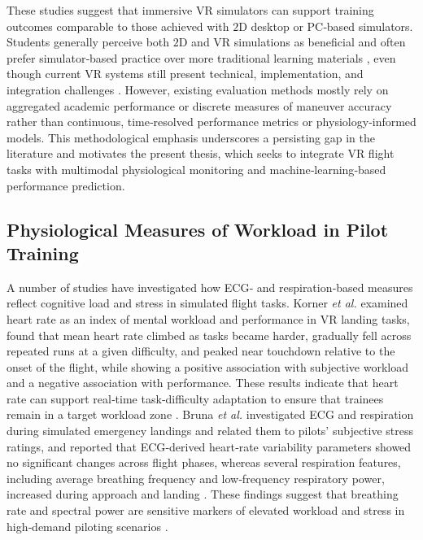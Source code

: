 \documentclass[11pt, a4paper]{article}
\begin{document}
These studies suggest that immersive VR simulators can support training outcomes comparable to those achieved with $2$D desktop or PC‑based simulators. Students generally perceive both $2$D and VR simulations as beneficial and often prefer simulator‑based practice over more traditional learning materials \cite{hight-2022,guthridge-2023}, even though current VR systems still present technical, implementation, and integration challenges \cite{pena-2025}. However, existing evaluation methods mostly rely on aggregated academic performance or discrete measures of maneuver accuracy rather than continuous, time‑resolved performance metrics or physiology‑informed models. This methodological emphasis underscores a persisting gap in the literature and motivates the present thesis, which seeks to integrate VR flight tasks with multimodal physiological monitoring and machine‑learning‑based performance prediction.

\subsection{Physiological Measures of Workload in Pilot Training}
A number of studies have investigated how ECG‑ and respiration‑based measures reflect cognitive load and stress in simulated flight tasks. Korner \emph{et al.} \cite{koerner-2025} examined heart rate as an index of mental workload and performance in VR landing tasks, found that mean heart rate climbed as tasks became harder, gradually fell across repeated runs at a given difficulty, and peaked near touchdown relative to the onset of the flight, while showing a positive association with subjective workload and a negative association with performance. These results indicate that heart rate can support real‑time task‑difficulty adaptation to ensure that trainees remain in a target workload zone \cite{koerner-2025}. Bruna \emph{et al.} \cite{bruna-2018} investigated ECG and respiration during simulated emergency landings and related them to pilots’ subjective stress ratings, and reported that ECG‑derived heart‑rate variability parameters showed no significant changes across flight phases, whereas several respiration features, including average breathing frequency and low‑frequency respiratory power, increased during approach and landing \cite{bruna-2018}. These findings suggest that breathing rate and spectral power are sensitive markers of elevated workload and stress in high‑demand piloting scenarios \cite{bruna-2018}.
\end{document}

